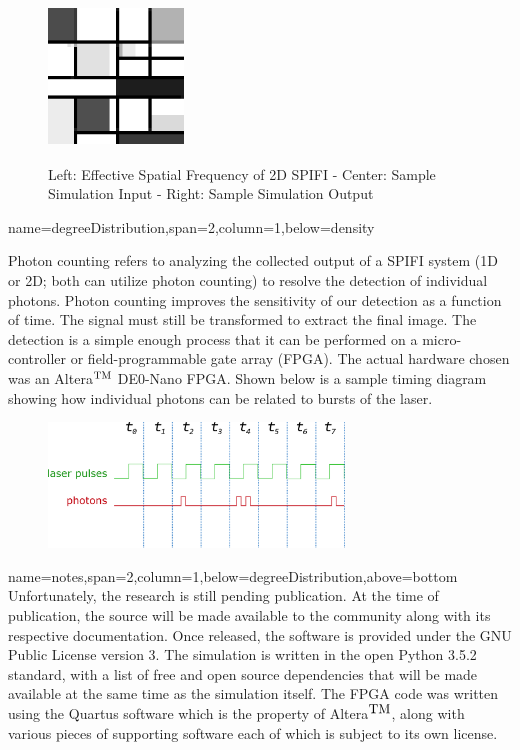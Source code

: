 \documentclass[a0paper,portrait]{baposter}
\begin{document}
\begin{poster}
{\begin{figure}[H]
	\includegraphics[width=0.32\textwidth,height=12em]{pix/testoutput}
	\caption{Left: Effective Spatial Frequency of 2D SPIFI - Center: Sample Simulation Input - Right: Sample Simulation Output}
\end{figure}
}

{name=degreeDistribution,span=2,column=1,below=density}{
Photon counting refers to analyzing the collected output of a SPIFI system (1D or 2D; both can utilize photon counting) to resolve the detection of individual photons. Photon counting improves the sensitivity of our detection as a function of time. The signal must still be transformed to extract the final image. The detection is a simple enough process that it can be performed on a micro-controller or field-programmable gate array (FPGA). The actual hardware chosen was an Altera$^\textnormal{TM}$ DE0-Nano FPGA. Shown below is a sample timing diagram showing how individual photons can be related to bursts of the laser.\\
\begin{figure}[H]
	\centering
	\includegraphics[width=0.7\textwidth]{pix/sample-timing-diagram}
\end{figure}
}

{name=notes,span=2,column=1,below=degreeDistribution,above=bottom}{
	Unfortunately, the research is still pending publication. At the time of publication, the source will be made available to the community along with its respective documentation.
Once released, the software is provided under the GNU Public License version 3. The simulation is written in the open Python 3.5.2 standard, with a list of free and open source dependencies that will be made available at the same time as the simulation itself. The FPGA code was written using the Quartus software which is the property of Altera$^\textnormal{\small TM}$, along with various pieces of supporting software each of which is subject to its own license.
}

\end{poster}
\end{document}
